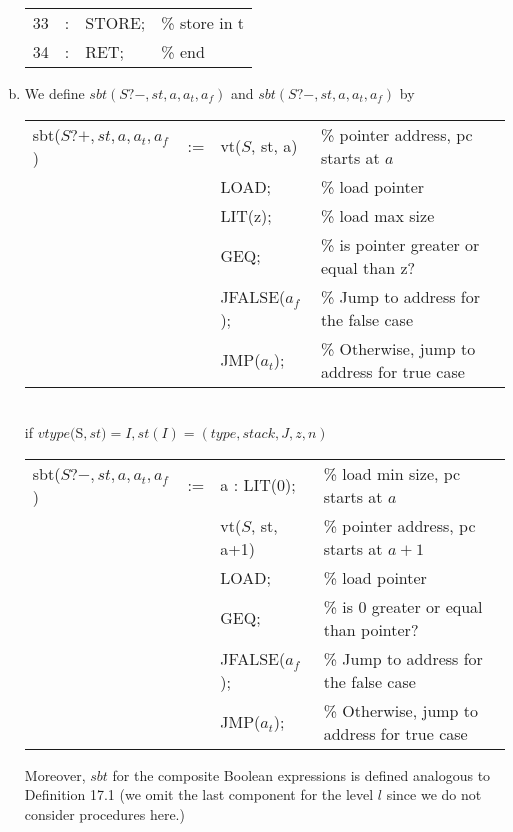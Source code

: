 \begin{solution}
\begin{enumerate}[(a)]
\begin{tabular}{rcll}
         33 & : \hspace{0.3cm} & STORE; &\% store in t\\
         34 & : \hspace{0.3cm} & RET; &\% end\\
      \end{tabular}
  
     \item We define $sbt(S?-, st, a, a_t, a_f)$ and $sbt(S?-, st, a, a_t, a_f)$ by
     
     \begin{tabular}{lcll}
     	sbt($S?+, st, a, a_t, a_f$) & := & vt($S$, st, a)   & \% pointer address, pc starts at $a$ \\
     	&    & LOAD;         & \% load pointer \\
     	&    & LIT(z);       & \% load max size \\
     	&    & GEQ;          & \% is pointer greater or equal than z? \\
     	&    &JFALSE($a_f$); & \% Jump to address for the false case \\
     	&    & JMP($a_t$); & \% Otherwise, jump to address for true case
     \end{tabular}\\
     if $vtype($S$,st)=I, st(I)=(type,stack,J,z,n)$\\
     
     \begin{tabular}{lcll}
     	sbt($S?-, st, a, a_t, a_f$) & := & a : LIT(0);       & \% load min size, pc starts at $a$ \\
     	&    & vt($S$, st, a+1)   & \% pointer address, pc starts at $a+1$ \\
     	&    & LOAD;         & \% load pointer \\
     	&    & GEQ;          & \% is 0 greater or equal than pointer? \\
     	&    &JFALSE($a_f$); & \% Jump to address for the false case \\
     	&    & JMP($a_t$); & \% Otherwise, jump to address for true case
     \end{tabular}
    
    Moreover, $sbt$ for the composite Boolean expressions is defined analogous to Definition 17.1 (we omit the last component for the level $l$ since we do not consider procedures here.)
 
     
     
  \end{enumerate}
\end{solution}
